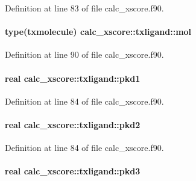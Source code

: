 Definition at line 83 of file calc\-\_\-xscore.\-f90.

\hypertarget{structcalc__xscore_1_1txligand_ac3cfc30ae032c05dcc94c1d979d2ca63}{
\paragraph[{mol}]{\setlength{\rightskip}{0pt plus 5cm}type({\bf txmolecule}) calc\-\_\-xscore\-::txligand\-::mol}}\label{structcalc__xscore_1_1txligand_ac3cfc30ae032c05dcc94c1d979d2ca63}


Definition at line 90 of file calc\-\_\-xscore.\-f90.

\hypertarget{structcalc__xscore_1_1txligand_a4abba718779f82da3df9f6fd8a6ed12d}{
\paragraph[{pkd1}]{\setlength{\rightskip}{0pt plus 5cm}real calc\-\_\-xscore\-::txligand\-::pkd1}}\label{structcalc__xscore_1_1txligand_a4abba718779f82da3df9f6fd8a6ed12d}


Definition at line 84 of file calc\-\_\-xscore.\-f90.

\hypertarget{structcalc__xscore_1_1txligand_a62491e1f73ab61616eecd7f87409b522}{
\paragraph[{pkd2}]{\setlength{\rightskip}{0pt plus 5cm}real calc\-\_\-xscore\-::txligand\-::pkd2}}\label{structcalc__xscore_1_1txligand_a62491e1f73ab61616eecd7f87409b522}


Definition at line 84 of file calc\-\_\-xscore.\-f90.

\hypertarget{structcalc__xscore_1_1txligand_a9b60deb48094f0ee65f0ff8616e2ac46}{
\paragraph[{pkd3}]{\setlength{\rightskip}{0pt plus 5cm}real calc\-\_\-xscore\-::txligand\-::pkd3}}\label{structcalc__xscore_1_1txligand_a9b60deb48094f0ee65f0ff8616e2ac46}


